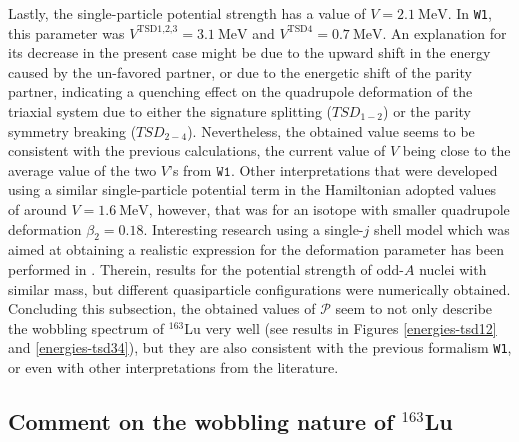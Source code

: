 \documentclass[myclassdoc,debug]{rjparticle}
\begin{document}
Lastly, the single-particle potential strength has a value of $V=2.1\ \text{MeV}$. In \texttt{W1}, this parameter was $V^{\text{TSD1,2,3}}=3.1\ \text{MeV}$ and $V^\text{TSD4}=0.7\ \text{MeV}$. An explanation for its decrease in the present case might be due to the upward shift in the energy caused by the un-favored partner, or due to the energetic shift of the parity partner, indicating a quenching effect on the quadrupole deformation of the triaxial system due to either the signature splitting ($TSD_{1-2}$) or the parity symmetry breaking ($TSD_{2-4}$). Nevertheless, the obtained value seems to be consistent with the previous calculations, the current value of $V$ being close to the average value of the two $V$'s from $\texttt{W1}$. Other interpretations \cite{tanabe2017stability} that were developed using a similar single-particle potential term in the Hamiltonian adopted values of around $V=1.6\ \text{MeV}$, however, that was for an isotope with smaller quadrupole deformation $\beta_2=0.18$. Interesting research using a single-$j$ shell model which was aimed at obtaining a realistic expression for the deformation parameter has been performed in \cite{shou2009coupling}. Therein, results for the potential strength of odd-$A$ nuclei with similar mass, but different quasiparticle configurations were numerically obtained. Concluding this subsection, the obtained values of $\mathcal{P}$ seem to not only describe the wobbling spectrum of $^{163}$Lu very well (see results in Figures \ref{energies-tsd12} and \ref{energies-tsd34}), but they are also consistent with the previous formalism \texttt{W1}, or even with other interpretations from the literature. 

\subsection{\texorpdfstring{Comment on the wobbling nature of $^{163}$Lu}%
                               {Comment on the wobbling nature of 163Lu}}\label{wobbling-comment}
\end{document}

